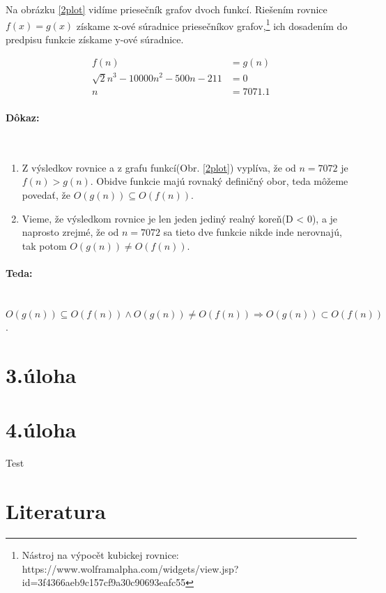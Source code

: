 \documentclass[11pt,a4paper]{article}
\begin{document}
Na obrázku \ref{2plot} vidíme priesečník grafov dvoch funkcí. Riešením rovnice $ f(x) = g(x) $ získame x-ové súradnice priesečníkov grafov,\footnote{Nástroj na výpocět kubickej rovnice: https://www.wolframalpha.com/widgets/view.jsp?id=3f4366aeb9c157cf9a30c90693eafc55} ich dosadením do predpisu funkcie získame y-ové súradnice.

\label{2equation}
\begin{align*}
    f(n) & = g(n) \\
   \sqrt{2} n^3 - 10000n^2 -500n -211 & = 0 \\
    n & = 7071.1
\end{align*}

\newpage
\paragraph{Dôkaz:}\mbox{{}}\\
\begin{enumerate}
    \item Z výsledkov rovnice a z grafu funkcí(Obr. \ref{2plot}) vyplíva, že od $n = 7072$ je $ f(n) > g(n)$. Obidve funkcie majú rovnaký definičný obor, teda môžeme povedať, že $ O(g(n)) \subseteq O(f(n)) $.

    \item Vieme, že výsledkom rovnice je len jeden jediný realný koreň(D < 0), a je naprosto zrejmé, že od $ n = 7072 $ sa tieto dve funkcie nikde inde nerovnajú, tak potom $ O(g(n)) \neq O(f(n)) $.
\end{enumerate}

\paragraph{Teda:}\mbox{{}}\\
$ O(g(n)) \subseteq O(f(n)) \land O(g(n)) \neq O(f(n)) \Rightarrow O(g(n)) \subset O(f(n)) $.


\newpage
\section{3.úloha}
\newpage

\section{4.úloha}
\newpage




























Test \cite{AA}







\newpage
\section{Literatura}

\begin{flushleft}
    
    \end{flushleft}
\end{document}
